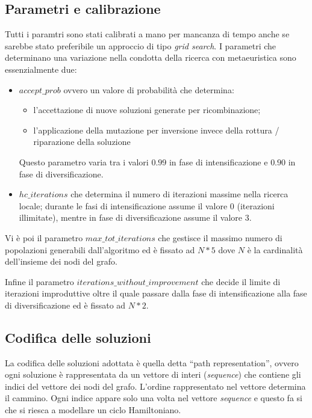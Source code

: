 \documentclass[a4paper]{article}
\begin{document}
        \subsection{Parametri e calibrazione}
            Tutti i paramtri sono stati calibrati a mano per mancanza di tempo anche se sarebbe stato preferibile un approccio di tipo
            \emph{grid search}.
            I parametri che determinano una variazione nella condotta della ricerca con metaeuristica sono essenzialmente due:
            \begin{itemize}
                \item $accept\_prob$ ovvero un valore di probabilit\`a che determina:
                    \begin{itemize}
                        \item l'accettazione di nuove soluzioni generate per ricombinazione;
                        \item l'applicazione della mutazione per inversione invece della rottura / riparazione della soluzione
                    \end{itemize}
                    Questo parametro varia tra i valori $0.99$ in fase di intensificazione e $0.90$ in fase di diversificazione.
                \item $hc\_iterations$ che determina il numero di iterazioni massime nella ricerca locale; durante le fasi di
                    intensificazione assume il valore $0$ (iterazioni illimitate), mentre in fase di diversificazione assume il valore 3.
            \end{itemize}

            Vi \`e poi il parametro $max\_tot\_iterations$ che gestisce il massimo numero di popolazioni generabili dall'algoritmo ed \`e fissato
            ad $N*5$ dove $N$ \`e la cardinalit\`a dell'insieme dei nodi del grafo.

            Infine il parametro $iterations\_without\_improvement$ che decide il limite di iterazioni improduttive oltre il quale passare dalla
            fase di intensificazione alla fase di diversificazione ed \`e fissato ad $N*2$.

        \subsection{Codifica delle soluzioni}
            La codifica delle soluzioni adottata \`e quella detta ``path representation'', ovvero
            ogni soluzione \`e rappresentata da un vettore di interi (\emph{sequence}) che contiene
            gli indici del vettore dei nodi del grafo. L'ordine rappresentato nel vettore determina il cammino.
            Ogni indice appare solo una volta nel vettore \emph{sequence} e questo fa si che si riesca a modellare
            un ciclo Hamiltoniano.
\end{document}
